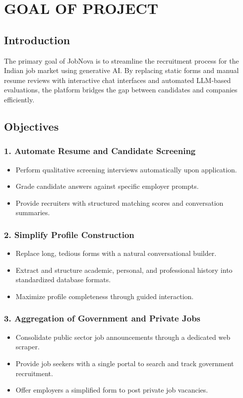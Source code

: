 \documentclass[12pt,a4paper]{report}
\begin{document}
\chapter{GOAL OF PROJECT}

\section{Introduction}

The primary goal of JobNova is to streamline the recruitment process for the Indian job market using generative AI. By replacing static forms and manual resume reviews with interactive chat interfaces and automated LLM-based evaluations, the platform bridges the gap between candidates and companies efficiently.

\section{Objectives}

\subsection{1. Automate Resume and Candidate Screening}
\begin{itemize}
    \item Perform qualitative screening interviews automatically upon application.
    \item Grade candidate answers against specific employer prompts.
    \item Provide recruiters with structured matching scores and conversation summaries.
\end{itemize}

\subsection{2. Simplify Profile Construction}
\begin{itemize}
    \item Replace long, tedious forms with a natural conversational builder.
    \item Extract and structure academic, personal, and professional history into standardized database formats.
    \item Maximize profile completeness through guided interaction.
\end{itemize}

\subsection{3. Aggregation of Government and Private Jobs}
\begin{itemize}
    \item Consolidate public sector job announcements through a dedicated web scraper.
    \item Provide job seekers with a single portal to search and track government recruitment.
    \item Offer employers a simplified form to post private job vacancies.
\end{itemize}
\end{document}

